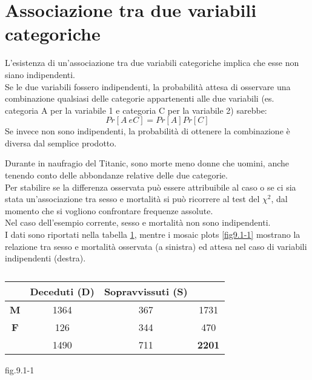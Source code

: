 \documentclass[drafts, 10pt]{book}
\newcounter{example}[section]
\begin{document}
\section{Associazione tra due variabili categoriche}
L'esistenza di un'associazione tra due variabili categoriche implica che esse non siano indipendenti.
\\
Se le due variabili fossero indipendenti, la probabilità attesa di osservare una combinazione qualsiasi delle categorie appartenenti alle due variabili (es. categoria A per la variabile 1 e categoria C per la variabile 2) sarebbe:
\begin{equation}
Pr[A\ e C] = Pr[A] Pr[C]
\end{equation}
Se invece non sono indipendenti, la probabilità di ottenere la combinazione è diversa dal semplice prodotto.
\begin{example}
    Durante in naufragio del Titanic, sono morte meno donne che uomini, anche tenendo conto delle abbondanze relative delle due categorie.
    \\
    Per stabilire se la differenza osservata può essere attribuibile al caso o se ci sia stata un'associazione tra sesso e mortalità si può ricorrere al test del $\chi^2$, dal momento che si vogliono confrontare frequenze assolute.
    \\
    Nel caso dell'esempio corrente, sesso e mortalità non sono indipendenti.
    \\
    I dati sono riportati nella tabella \ref{tabtitanic}, mentre i mosaic plots \ref{fig9.1-1} mostrano la relazione tra sesso e mortalità osservata (a sinistra) ed attesa nel caso di variabili indipendenti (destra).
\begin{table}[H]
        \centering
        \renewcommand\arraystretch{1.2}
        \begin{tabular}{c|c|c|c}
        \hline
         & \textbf{Deceduti (D)} & \textbf{Sopravvissuti (S)} & \\
        \hline
        \textbf{M} & 1364 & 367 & 1731 \\
        \hline
        \textbf{F} & 126 & 344 & 470\\
        \hline
         & 1490 & 711 & \textbf{2201}\\
        \hline
        \end{tabular}
        \caption{}
        \label{tabtitanic}
\end{table}\noindent
    fig.9.1-1 \label{fig9.1-1}%
    \\
\end{example}
\end{document}
